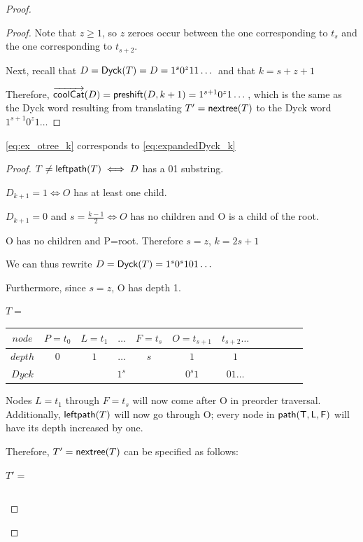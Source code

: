 \begin{proof}
\begin{proof}
    Note that $z \ge 1$, so $z$ zeroes occur between the one corresponding to $t_{s}$ and the one corresponding to $t_{s+2}$.


    Next, recall that $D=\mathsf{Dyck}{(T)}=D=1^s0^z11\dots$ and that $k=s+z+1$

    Therefore, $\overrightarrow{\mathsf{coolCat}}{(D)}=\mathsf{preshift(} D, k+1 \mathsf{)}=1^{s+1}0^z1\dots$, which is the same as the Dyck word resulting from translating $T'=\mathsf{nextree}{(T)}$ to the Dyck word $1^{s+1}0^z1\dots$

\end{proof}
\begin{lemma}
    \ref{eq:ex_otree_k} corresponds to \ref{eq:expandedDyck_k}
\end{lemma}
\begin{proof}

    $T \ne \mathsf{leftpath}{(T)} \iff D$ has a 01 substring.

    $D_{k+1}=1 \iff O$ has at least one child.

    $D_{k+1}=0$ and $s=\frac{k-1}{2} \iff O$ has no children and O is a child of the root.

    O has no children and P=root. Therefore $s=z$, $k=2s+1$

    We can thus rewrite $D=\mathsf{Dyck}{(T)}=1^s0^s101\dots$

    Furthermore, since $s=z$, O has depth 1. 

    \noindent $T=$
    \begin{center}
	\begin{tabular}{ |c|c|c|c|c|c|c|c|c|c|c|c| } 
	    \hline

	    $node$ & $P=t_0$ & $L=t_1$ & $\dots$ & $F=t_s$ & $O=t_{s+1}$ & $t_{s+2}\dots$ \\
	    \hline
	    $depth$ & $0$ & $1$ & $\dots$ & $s$ & $1$ & $1$ \\
	    \hline
	    $Dyck$ &  &  \multicolumn{3}{|c|}{$1^s$} &  $0^{s}1$   & $01\dots$\\
	    \hline
	\end{tabular}
    \end{center}

    Nodes $L=t_{1}$ through $F=t_s$ will now come after O in preorder traversal.  Additionally, $\mathsf{leftpath}{(T)}$ will now go through O; every node in $\mathsf{path({T}, L, F)}$ will have its depth increased by one.  

    Therefore, $T'=\mathsf{nextree}{(T)}$ can be specified as follows: 

    \noindent $T'=$
    \begin{center}
	\begin{tabular}{ |c|c|c|c|c|c|c|c|c|c|c|c| } 
	    \hline


\end{tabular}
\end{center}
\end{proof}
\end{proof}
